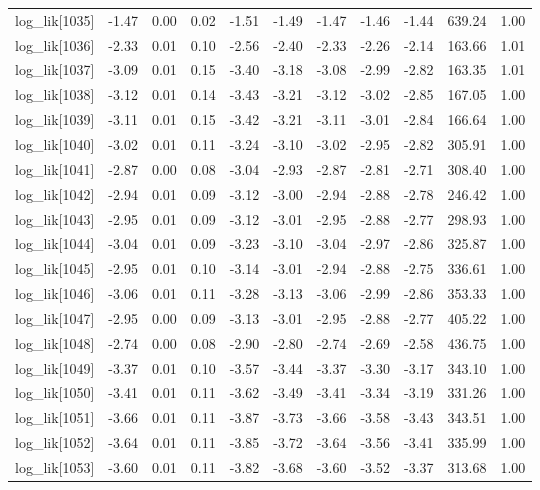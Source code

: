 \begin{table}[ht]
\begin{tabular}{rrrrrrrrrrr}
  log\_lik[1035] & -1.47 & 0.00 & 0.02 & -1.51 & -1.49 & -1.47 & -1.46 & -1.44 & 639.24 & 1.00 \\ 
  log\_lik[1036] & -2.33 & 0.01 & 0.10 & -2.56 & -2.40 & -2.33 & -2.26 & -2.14 & 163.66 & 1.01 \\ 
  log\_lik[1037] & -3.09 & 0.01 & 0.15 & -3.40 & -3.18 & -3.08 & -2.99 & -2.82 & 163.35 & 1.01 \\ 
  log\_lik[1038] & -3.12 & 0.01 & 0.14 & -3.43 & -3.21 & -3.12 & -3.02 & -2.85 & 167.05 & 1.00 \\ 
  log\_lik[1039] & -3.11 & 0.01 & 0.15 & -3.42 & -3.21 & -3.11 & -3.01 & -2.84 & 166.64 & 1.00 \\ 
  log\_lik[1040] & -3.02 & 0.01 & 0.11 & -3.24 & -3.10 & -3.02 & -2.95 & -2.82 & 305.91 & 1.00 \\ 
  log\_lik[1041] & -2.87 & 0.00 & 0.08 & -3.04 & -2.93 & -2.87 & -2.81 & -2.71 & 308.40 & 1.00 \\ 
  log\_lik[1042] & -2.94 & 0.01 & 0.09 & -3.12 & -3.00 & -2.94 & -2.88 & -2.78 & 246.42 & 1.00 \\ 
  log\_lik[1043] & -2.95 & 0.01 & 0.09 & -3.12 & -3.01 & -2.95 & -2.88 & -2.77 & 298.93 & 1.00 \\ 
  log\_lik[1044] & -3.04 & 0.01 & 0.09 & -3.23 & -3.10 & -3.04 & -2.97 & -2.86 & 325.87 & 1.00 \\ 
  log\_lik[1045] & -2.95 & 0.01 & 0.10 & -3.14 & -3.01 & -2.94 & -2.88 & -2.75 & 336.61 & 1.00 \\ 
  log\_lik[1046] & -3.06 & 0.01 & 0.11 & -3.28 & -3.13 & -3.06 & -2.99 & -2.86 & 353.33 & 1.00 \\ 
  log\_lik[1047] & -2.95 & 0.00 & 0.09 & -3.13 & -3.01 & -2.95 & -2.88 & -2.77 & 405.22 & 1.00 \\ 
  log\_lik[1048] & -2.74 & 0.00 & 0.08 & -2.90 & -2.80 & -2.74 & -2.69 & -2.58 & 436.75 & 1.00 \\ 
  log\_lik[1049] & -3.37 & 0.01 & 0.10 & -3.57 & -3.44 & -3.37 & -3.30 & -3.17 & 343.10 & 1.00 \\ 
  log\_lik[1050] & -3.41 & 0.01 & 0.11 & -3.62 & -3.49 & -3.41 & -3.34 & -3.19 & 331.26 & 1.00 \\ 
  log\_lik[1051] & -3.66 & 0.01 & 0.11 & -3.87 & -3.73 & -3.66 & -3.58 & -3.43 & 343.51 & 1.00 \\ 
  log\_lik[1052] & -3.64 & 0.01 & 0.11 & -3.85 & -3.72 & -3.64 & -3.56 & -3.41 & 335.99 & 1.00 \\ 
  log\_lik[1053] & -3.60 & 0.01 & 0.11 & -3.82 & -3.68 & -3.60 & -3.52 & -3.37 & 313.68 & 1.00 \\ 

\end{tabular}
\end{table}
